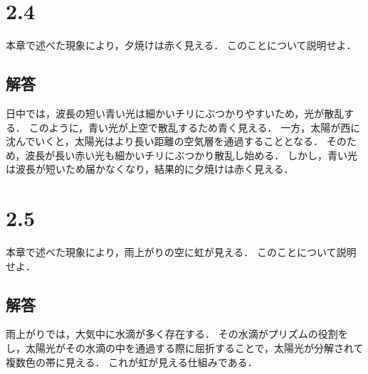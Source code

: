\section*{2.4}
本章で述べた現象により，夕焼けは赤く見える．
このことについて説明せよ．

\subsection*{解答}
日中では，波長の短い青い光は細かいチリにぶつかりやすいため，光が散乱する．
このように，青い光が上空で散乱するため青く見える．
一方，太陽が西に沈んでいくと，太陽光はより長い距離の空気層を通過することとなる．
そのため，波長が長い赤い光も細かいチリにぶつかり散乱し始める．
しかし，青い光は波長が短いため届かなくなり，結果的に夕焼けは赤く見える．

\section*{2.5}
本章で述べた現象により，雨上がりの空に虹が見える．
このことについて説明せよ．

\subsection*{解答}
雨上がりでは，大気中に水滴が多く存在する．
その水滴がプリズムの役割をし，太陽光がその水滴の中を通過する際に屈折することで，太陽光が分解されて複数色の帯に見える．
これが虹が見える仕組みである．